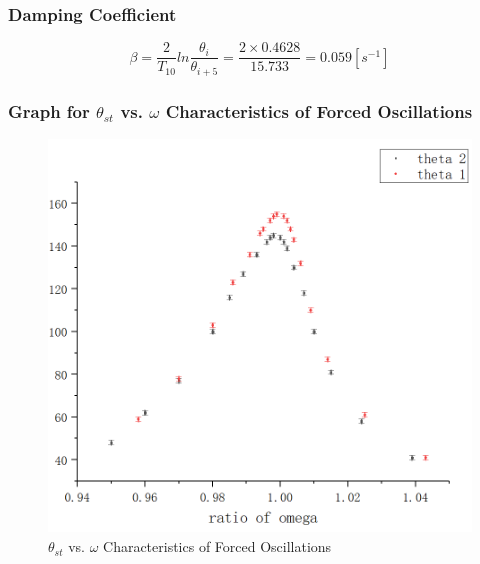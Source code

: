 \documentclass[12pt]{article}
\begin{document}
\subsubsection{Damping Coefficient}
$$\beta=\frac{2}{T_{10}}ln\frac{\theta_i}{\theta_{i+5}}=\frac{2\times0.4628}{15.733}=0.059[s^{-1}]$$
\subsubsection{Graph for $\theta_{st}$ vs. $\omega$ Characteristics of Forced Oscillations}
\begin{figure}[H]
\centering
\includegraphics[scale=0.35]{P5.jpg}
\caption{ $\theta_{st}$ vs. $\omega$ Characteristics of Forced Oscillations}
\end{figure}
\end{document}
